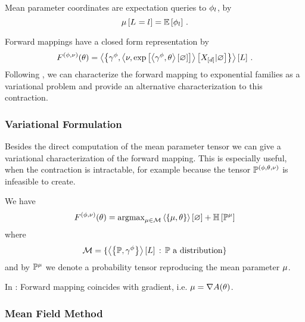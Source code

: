 

Mean parameter coordinates are expectation queries to $\phi_{l}$, by 
	\[ \mu\left[L_{}=l_{}\right] = \mathbb{E}\left[\phi_{l}\right] \, . \]
	
Forward mappings have a closed form representation by
	\[ F^{(\phi,\nu)}(\theta)  
	= \left\langle \left\{\gamma^{\phi},\left\langle \nu,\mathrm{exp}\left[\left\langle \gamma^{\phi},\theta\right\rangle \left[ \varnothing \right]\right]\right\rangle \left[ X_{[d]} | \varnothing \right]\right\}\right\rangle \left[ L \right] \, . \]
Following \cite{wainwright_graphical_2008}, we can characterize the forward mapping to exponential families as a variational problem and provide an alternative characterization to this contraction.



\subsubsection{Variational Formulation}

Besides the direct computation of the mean parameter tensor we can give a variational characterization of the forward mapping.
This is especially useful, when the contraction is intractable, for example because the tensor $\mathbb{P}^{(\phi,\theta,\nu)}$ is infeasible to create.

We have
\begin{align*}
	F^{(\phi,\nu)}(\theta)  = \mathrm{argmax}_{\mu\in\mathcal{M}}  \left\langle \left\{\mu,\theta\right\}\right\rangle \left[ \varnothing \right] + \mathbb{H}\left[\mathbb{P}^{\mu}\right] 
\end{align*}
where 
\begin{align*}
	 \mathcal{M} = \{  \left\langle \left\{\mathbb{P},\gamma^{\phi}\right\}\right\rangle \left[ L \right] \, :  \,  \mathbb{P} \,\, \text{a distribution} \}
\end{align*}
and by $\mathbb{P}^{\mu}$ we denote a probability tensor reproducing the mean parameter $\mu$.

In \cite{wainwright_graphical_2008}: 
Forward mapping coincides with gradient, i.e. $\mu = \nabla A(\theta)$.


\subsubsection{Mean Field Method}


